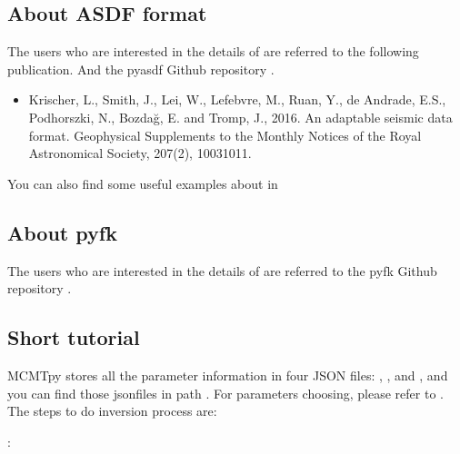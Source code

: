 \documentclass[a4paper,10pt,english,openany]{sphinxmanual}
\begin{document}
\subsection{About ASDF format}
\label{\detokenize{tutorial:about-asdf-format}}
The users who are interested in the details of  are referred to the following publication.
And the pyasdf Github repository .
\begin{itemize}
\item {} 
Krischer, L., Smith, J., Lei, W., Lefebvre, M., Ruan, Y., de Andrade, E.S., Podhorszki, N., Bozdağ, E.
and Tromp, J., 2016. An adaptable seismic data format. Geophysical Supplements to the Monthly Notices
of the Royal Astronomical Society, 207(2), 1003\sphinxhyphen{}1011.

\end{itemize}

You can also find some useful examples about  in %
\begin{footnote}[8]\sphinxAtStartFootnote
{}
%
\end{footnote}


\subsection{About pyfk}
\label{\detokenize{tutorial:about-pyfk}}
The users who are interested in the details of  are referred to the pyfk Github
repository .


\subsection{Short tutorial}
\label{\detokenize{tutorial:short-tutorial}}
MCMTpy stores all the parameter information in four JSON files: , ,
 and , and you can find those json\sphinxhyphen{}files in path .
For parameters choosing, please refer to . The steps to do inversion process are:

:
\end{document}
